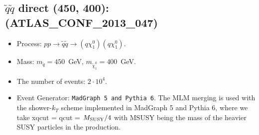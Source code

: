     
\subsection{$\tilde q \tilde q$ direct (450, 400): (ATLAS\_CONF\_2013\_047)} 


        \begin{itemize}
        \item  Process: $pp \to \tilde q \tilde q \to (q \chi_1^0)(q \chi_1^0)$.
        \item  Mass: $m_{\tilde q} = 450$~GeV, $m_{\tilde \chi_1^0} = 400$~GeV.
        \item  The number of events: $2 \cdot 10^4$.
        \item  Event Generator: {\tt MadGraph 5 and Pythia 6}.
                The MLM merging is used with the shower-$k_T$ scheme implemented in MadGraph 5 and Pythia 6, where we take xqcut = qcut = $M_{\rm SUSY}/4$ with MSUSY being the mass of the heavier SUSY particles in the production.      
        \end{itemize}    
    
